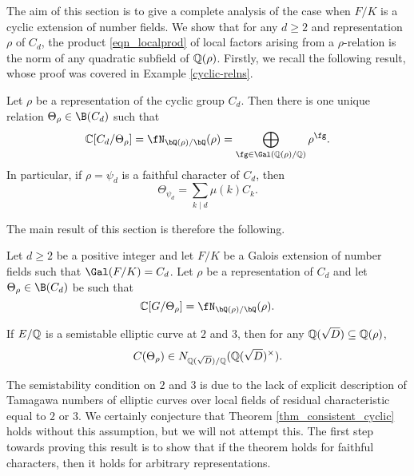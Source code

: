 The aim of this section is to give a complete analysis of the case when $F/K$ is a cyclic extension of number fields. We show that for any $d\geq 2$ and representation $\rho$ of $C_d$, the product \eqref{eqn_localprod} of local factors arising from a $\rho$-relation is the norm of any quadratic subfield of $\mathbb{Q}(\rho)$. 
Firstly, we recall the following result, whose proof was covered in Example \ref{cyclic-relns}.

\begin{lemma}\label{lem_relation}
    Let $\rho$ be a representation of the cyclic group $C_d$. Then there is one unique relation $\Theta_\rho\in \B(C_d)$ such that 
    $$\CC[C_d/\Theta_{\rho}]=\repnorm{\rho}=\bigoplus_{\fg\in\Gal(\QQ(\rho)/\QQ)}\rho^{\fg}.$$
    In particular, if $\rho=\psi_d$ is a faithful character of $C_d$, then
    $$\Theta_{\psi_d}=\sum_{k\mid d}\mu(k)C_k.$$
\end{lemma}




The main result of this section is therefore the following.

\begin{thm}\label{thm_consistent_cyclic}
    Let $d\geq2$ be a positive integer and let $F/K$ be a Galois extension of number fields such that $\Gal(F/K)=C_d$. Let $\rho$ be a representation of $C_d$ and let $\Theta_\rho\in \B(C_d)$ be such that
    $$\CC[G/\Theta_\rho]=\repnorm{\rho}.$$

    If $E/\mathbb{Q}$ is a semistable elliptic curve at $2$ and $3$, then for any $\mathbb{Q}(\sqrt{D})\subseteq\mathbb{Q}(\rho)$,
    $$C(\Theta_\rho)\in N_{\mathbb{Q}(\sqrt{D})/\mathbb{Q}}(\mathbb{Q}(\sqrt{D})^{\times}).$$
\end{thm}

The semistability condition on $2$ and $3$ is due to the lack of explicit description of Tamagawa numbers of elliptic curves over local fields of residual characteristic equal to $2$ or $3$. We certainly conjecture that Theorem \ref{thm_consistent_cyclic} holds without this assumption, but we will not attempt this. The first step towards proving this result is to show that if the theorem holds for faithful characters, then it holds for arbitrary representations. 

